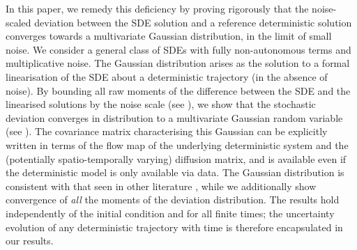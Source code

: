 
In this paper, we remedy this deficiency by proving rigorously that the noise-scaled deviation between the SDE solution and a reference deterministic solution converges towards a multivariate Gaussian distribution, in the limit of small noise.
We consider a general class of SDEs with fully non-autonomous terms and multiplicative noise.
The Gaussian distribution arises as the solution to a formal linearisation of the SDE about a deterministic trajectory (in the absence of noise).
By bounding all raw moments of the difference between the SDE and the linearised solutions by the noise scale (see ), we show that the stochastic deviation converges in distribution to a multivariate Gaussian random variable (see ). 
The covariance matrix characterising this Gaussian can be explicitly written in terms of the flow map of the underlying deterministic system and the (potentially spatio-temporally varying) diffusion matrix, and is available even if the deterministic model is only available via data.
The Gaussian distribution is consistent with that seen in other literature \cite{Jazwinski_2014_StochasticProcessesFiltering, Sanz-AlonsoStuart_2017_GaussianApproximationsSmall, SarkkaSolin_2019_AppliedStochasticDifferential}, while we additionally show convergence of \emph{all} the moments of the deviation distribution.
The results hold independently of the initial condition and for all finite times; the uncertainty evolution of any deterministic trajectory with time is therefore encapsulated in our results.

